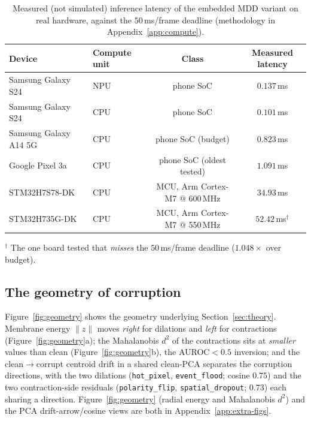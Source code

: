﻿\documentclass{article} %
\theoremstyle{remark}
\begin{document}
\begin{table}[t]
  \centering\small
  \caption{Measured (not simulated) inference latency of the embedded MDD variant on real
  hardware, against the $50$\,ms/frame deadline (methodology in Appendix~\ref{app:compute}).}
  \label{tab:mdd-hw}
  \begin{tabular}{llcc}
    \toprule
    Device & Compute unit & Class & Measured latency \\
    \midrule
    Samsung Galaxy S24  & NPU & phone SoC & $0.137$\,ms \\
    Samsung Galaxy S24  & CPU & phone SoC & $0.101$\,ms \\
    Samsung Galaxy A14 5G & CPU & phone SoC (budget) & $0.823$\,ms \\
    Google Pixel 3a     & CPU & phone SoC (oldest tested) & $1.091$\,ms \\
    STM32H7S78-DK       & CPU & MCU, Arm Cortex-M7 @ 600\,MHz & $34.93$\,ms \\
    STM32H735G-DK       & CPU & MCU, Arm Cortex-M7 @ 550\,MHz & $52.42$\,ms$^\dagger$ \\
    \bottomrule
  \end{tabular}

  \vspace{2pt}
  {\scriptsize $^\dagger$ The one board tested that \emph{misses} the $50$\,ms/frame deadline
  ($1.048\times$ over budget).}
\end{table}

\subsection{The geometry of corruption}
\label{sec:geometry}
Figure~\ref{fig:geometry} shows the geometry underlying Section~\ref{sec:theory}. Membrane
energy $\lVert z\rVert$ moves \emph{right} for dilations and \emph{left} for contractions
(Figure~\ref{fig:geometry}a); the Mahalanobis $d^2$ of the contractions sits at \emph{smaller}
values than clean (Figure~\ref{fig:geometry}b), the AUROC$<0.5$ inversion; and
the clean$\to$corrupt centroid drift in a shared clean-PCA separates
the corruption directions, with the two dilations (\texttt{hot\_pixel}, \texttt{event\_flood};
cosine $0.75$) and the two contraction-side residuals (\texttt{polarity\_flip},
\texttt{spatial\_dropout}; $0.73$) each sharing a direction. Figure~\ref{fig:geometry}
(radial energy and Mahalanobis $d^2$) and the PCA drift-arrow/cosine views are both in
Appendix~\ref{app:extra-figs}.
\end{document}
